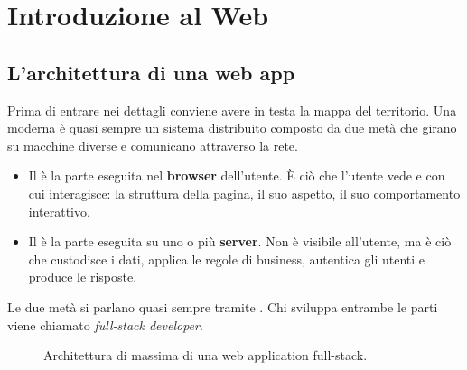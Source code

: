 \chapter{Introduzione al Web}

\section{L'architettura di una web app}

Prima di entrare nei dettagli conviene avere in testa la mappa del territorio.
Una  moderna è quasi sempre un sistema distribuito
composto da due metà che girano su macchine diverse e comunicano attraverso la
rete.

\begin{itemize}
  \item Il  è la parte eseguita nel \textbf{browser} dell'utente.
        È ciò che l'utente vede e con cui interagisce: la struttura della pagina,
        il suo aspetto, il suo comportamento interattivo.
  \item Il  è la parte eseguita su uno o più \textbf{server}. Non
        è visibile all'utente, ma è ciò che custodisce i dati, applica le regole
        di business, autentica gli utenti e produce le risposte.
\end{itemize}

Le due metà si parlano quasi sempre tramite . Chi sviluppa entrambe
le parti viene chiamato \textit{full-stack developer}.

\begin{figure}[H]
  \centering
  \caption{Architettura di massima di una web application full-stack.}
  \label{fig:fullstack}
\end{figure}

